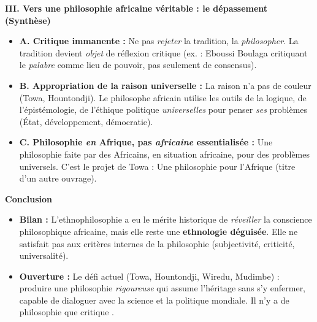 \documentclass[11pt]{article}
\begin{document}
\begin{exoresolu}
\textbf{III. Vers une philosophie africaine véritable : le dépassement (Synthèse)}
\begin{itemize}
    \item \textbf{A. Critique immanente :} Ne pas \emph{rejeter} la tradition, la \emph{philosopher}. La tradition devient \emph{objet} de réflexion critique (ex. : Eboussi Boulaga critiquant le \emph{palabre} comme lieu de pouvoir, pas seulement de consensus).
    \item \textbf{B. Appropriation de la raison universelle :} La raison n'a pas de couleur (Towa, Hountondji). Le philosophe africain utilise les outils de la logique, de l'épistémologie, de l'éthique politique \emph{universelles} pour penser \emph{ses} problèmes (État, développement, démocratie).
    \item \textbf{C. Philosophie \emph{en} Afrique, pas \emph{africaine} essentialisée :} Une philosophie faite par des Africains, en situation africaine, pour des problèmes universels. C'est le projet de Towa : \guillemotleft Une philosophie pour l'Afrique \guillemotright (titre d'un autre ouvrage).
\end{itemize}

\textbf{Conclusion}
\begin{itemize}
    \item \textbf{Bilan :} L'ethnophilosophie a eu le mérite historique de \emph{réveiller} la conscience philosophique africaine, mais elle reste une \textbf{ethnologie déguisée}. Elle ne satisfait pas aux critères internes de la philosophie (subjectivité, criticité, universalité).
    \item \textbf{Ouverture :} Le défi actuel (Towa, Hountondji, Wiredu, Mudimbe) : produire une philosophie \emph{rigoureuse} qui assume l'héritage sans s'y enfermer, capable de dialoguer avec la science et la politique mondiale. \guillemotleft Il n'y a de philosophie que critique \guillemotright.
\end{itemize}
\end{exoresolu}
\end{document}
